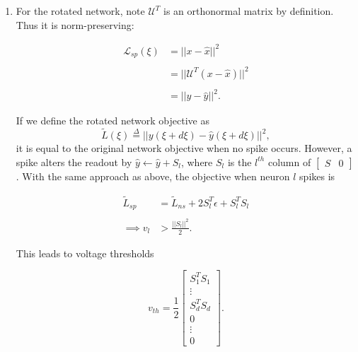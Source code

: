 \begin{enumerate}
\item For the rotated network, note $\mathcal{U}^T$ is an orthonormal matrix by definition. Thus it is norm-preserving:

\begin{align*}
\mathcal{L}_{sp}(\xi) &= ||x - \hat{x}||^2
\\
\\
&= 
||\mathcal{U}^T(x - \hat{x})||^2
\\
\\
&= 
||y - \hat{y}||^2.
\end{align*}

If we define the rotated network objective as 
$$
\tilde{L}(\xi) \overset{\Delta}{=} || y(\xi + d\xi) - \hat{y}(\xi + d\xi)||^2,
$$
it is equal to the original network objective when no spike occurs. However, a spike alters the readout by $\hat{y} \leftarrow \hat{y} + S_l$, where $S_l$ is the $l^{th}$ column of $\begin{bmatrix}
S & 0
\end{bmatrix}$. With the same approach as above, the objective when neuron $l$ spikes is

\begin{align*}
\tilde{L}_{sp} &= \tilde{L}_{ns} + 2 S_l^T\epsilon  + S_l^TS_l
\\
\\
\implies
v_l &> \frac{||S_l||^2}{2}.
\end{align*}

This leads to voltage thresholds

$$
v_{th} = \frac{1}{2}
\begin{bmatrix}
S_1^TS_1
\\
\vdots
\\
S_d^T S_d
\\
0
\\
\vdots
\\
0
\end{bmatrix}. 
$$

\end{enumerate}

